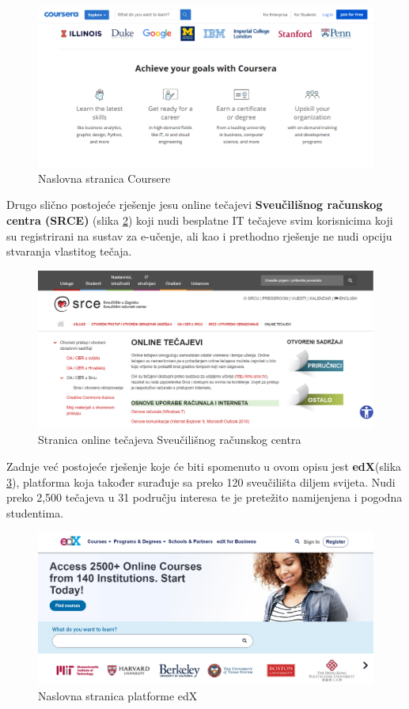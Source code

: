 	\begin{figure}[H]
		\includegraphics[scale=0.4]{slike/Coursera.PNG}
		\centering
		\caption{Naslovna stranica Coursere}
		\label{fig:Coursera}
	\end{figure}

	Drugo slično postojeće rješenje jesu online tečajevi \textbf{Sveučilišnog računskog centra (SRCE)} (slika \ref{fig:SRCE}) koji nudi besplatne IT tečajeve svim korisnicima koji su registrirani na sustav za e-učenje, ali kao i prethodno rješenje ne nudi opciju stvaranja vlastitog tečaja.
	
	\begin{figure}[H]
		\includegraphics[scale=0.4]{slike/SRCE.PNG} 
		\centering
		\caption{Stranica online tečajeva Sveučilišnog računskog centra}
		\label{fig:SRCE}
	\end{figure}  
	
	Zadnje već postojeće rješenje koje će biti spomenuto u ovom opisu jest \textbf{edX}(slika \ref{fig:edX}), platforma koja također surađuje sa preko 120 sveučilišta diljem svijeta. Nudi preko 2,500 tečajeva u 31 području interesa te je pretežito namijenjena i pogodna studentima. 
	
	\begin{figure}[H]
		\includegraphics[scale=0.4]{slike/edX.PNG} 
		\centering
		\caption{Naslovna stranica platforme edX}
		\label{fig:edX}
	\end{figure} 

